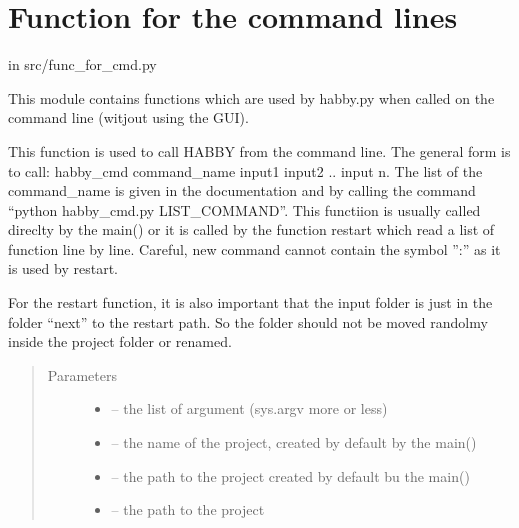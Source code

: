 \documentclass[letterpaper,10pt,english]{sphinxmanual}
\begin{document}
\section{Function for the command lines}
\label{\detokenize{index:function-for-the-command-lines}}
in src/func\_for\_cmd.py

This module contains functions which are used by habby.py when called on the command line (witjout using the GUI).
\label{\detokenize{index:module-src.func_for_cmd}}

\begin{fulllineitems}
\label{\detokenize{index:src.func_for_cmd.all_command}}
This function is used to call HABBY from the command line. The general form is to call:
habby\_cmd command\_name input1 input2 .. input n. The list of the command\_name is given in the documentation and by
calling the command ``python habby\_cmd.py LIST\_COMMAND''. This functiion is usually called direclty by the main()
or it is called by the function restart which read a list of function line by line. Careful, new command cannot
contain the symbol '':'' as it is used by restart.

For the restart function, it is also important that the input folder is just in the folder ``next'' to the restart
path. So the folder should not be moved randolmy inside the project folder or renamed.
\begin{quote}\begin{description}
\item[{Parameters}] \leavevmode\begin{itemize}
\item {} 
 -- the list of argument (sys.argv more or less)

\item {} 
 -- the name of the project, created by default by the main()

\item {} 
 -- the path to the project created by default bu the main()

\item {} 
 -- the path to the project


\end{itemize}
\end{description}
\end{quote}
\end{fulllineitems}
\end{document}
